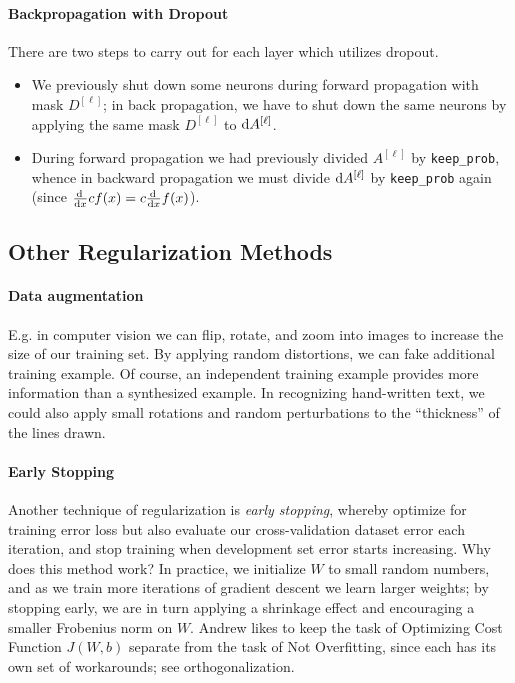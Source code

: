 \documentclass[12pt]{article}
\begin{document}
\paragraph{Backpropagation with Dropout} There are two steps to carry out for each layer which utilizes dropout.
\begin{itemize} \item We previously shut down some neurons during forward propagation with mask $D^{[\ell]}$; in back propagation, we have to shut down the same neurons by applying the same mask $D^{[\ell]}$ to $\operatorname{d}\!{A}^{[\ell]}$.
\item During forward propagation we had previously divided $A^{[\ell]}$ by \texttt{keep\_prob}, whence in backward propagation we must divide $\operatorname{d}\!{A}^{[\ell]}$ by \texttt{keep\_prob} again (since $\frac{\operatorname{d}\!{\,}}{\operatorname{d}\!{x}} c f(x) = c \frac{\operatorname{d}\!{\,}}{\operatorname{d}\!{x}} f(x)$). \end{itemize}

\subsection{Other Regularization Methods} 
\paragraph{Data augmentation} E.g. in computer vision we can flip, rotate, and zoom into images to increase the size of our training set. By applying random distortions, we can fake additional training example. Of course, an independent training example provides more information than a synthesized example. In recognizing hand-written text, we could also apply small rotations and random perturbations to the ``thickness'' of the lines drawn. 

\paragraph{Early Stopping}
Another technique of regularization is \emph{early stopping}, whereby optimize for training error loss but also evaluate our cross-validation dataset error each iteration, and stop training when development set error starts increasing. Why does this method work? In practice, we initialize $W$ to small random numbers, and as we train more iterations of gradient descent we learn larger weights; by stopping early, we are in turn applying a shrinkage effect and encouraging a smaller Frobenius norm on $W$. Andrew likes to keep the task of Optimizing Cost Function $J(W,b)$ separate from the task of Not Overfitting, since each has its own set of workarounds; see orthogonalization.
\end{document}
